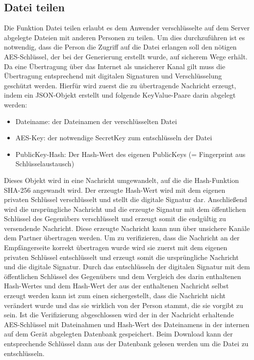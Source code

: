 \documentclass[10pt, a4paper,headsepline]{scrreprt}
\begin{document}
\subsection{Datei teilen}
Die Funktion Datei teilen erlaubt es dem Anwender verschlüsselte auf dem Server abgelegte Dateien mit anderen Personen zu teilen. Um dies durchzuführen ist es notwendig, dass die Person die Zugriff auf die Datei erlangen soll den nötigen AES-Schlüssel, der bei der Generierung erstellt wurde, auf sicherem Wege erhält. Da eine Übertragung über das Internet als unsicherer Kanal gilt muss die Übertragung entsprechend mit digitalen Signaturen und Verschlüsselung geschützt werden. Hierfür wird zuerst die zu übertragende Nachricht erzeugt, indem ein JSON-Objekt erstellt und folgende KeyValue-Paare darin abgelegt werden:
\begin{itemize}
\item Dateiname: der Dateinamen der verschlüsselten Datei
\item AES-Key: der notwendige SecretKey zum entschlüsseln der Datei
\item PublicKey-Hash: Der Hash-Wert des eigenen PublicKeys (= Fingerprint aus Schlüsselaustausch)
\end{itemize}
Dieses Objekt wird in eine Nachricht umgewandelt, auf die die Hash-Funktion SHA-256 angewandt wird. Der erzeugte Hash-Wert wird mit dem eigenen privaten Schlüssel verschlüsselt und stellt die digitale Signatur dar. Anschließend wird die ursprüngliche Nachricht und die erzeugte Signatur mit dem öffentlichen Schlüssel des Gegenübers verschlüsselt und erzeugt somit die endgültig zu versendende Nachricht.
Diese erzeugte Nachricht kann nun über unsichere Kanäle dem Partner übertragen werden. Um zu verifizieren, dass die Nachricht an der Empfängerseite korrekt übertragen wurde wird sie zuerst mit dem eigenen privaten Schlüssel entschlüsselt und erzeugt somit die ursprüngliche Nachricht und die digitale Signatur. Durch das entschlüsseln der digitalen Signatur mit dem öffentlichen Schlüssel des Gegenübers und dem Vergleich des darin enthaltenen Hash-Wertes und dem Hash-Wert der aus der enthaltenen Nachricht selbst erzeugt werden kann ist zum einen sichergestellt, dass die Nachricht nicht verändert wurde und das sie wirklich von der Person stammt, die sie vorgibt zu sein. Ist die Verifizierung abgeschlossen wird der in der Nachricht erhaltende AES-Schlüssel mit Dateinahmen und Hash-Wert des Dateinamens in der internen auf dem Gerät abgelegten Datenbank gespeichert. Beim Download kann der entsprechende Schlüssel dann aus der Datenbank gelesen werden um die Datei zu entschlüsseln.
\end{document}
